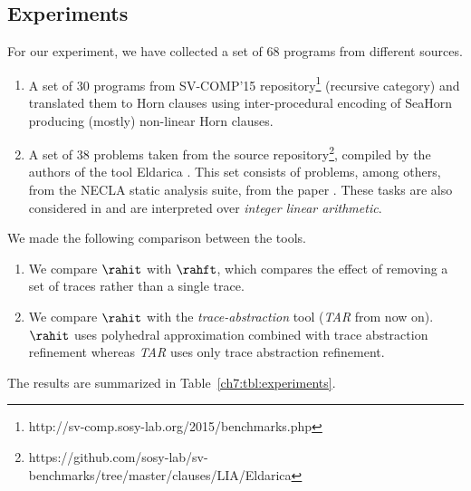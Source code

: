 \subsection{Experiments}
\label{ch7:experiments}

 For our experiment, we have collected a set of 68 programs from different sources.
\begin{enumerate}
\item A set of 30 programs from SV-COMP'15 repository\footnote{http://sv-comp.sosy-lab.org/2015/benchmarks.php} \cite{DBLP:conf/tacas/000115} (recursive category)  and translated them to Horn clauses using inter-procedural encoding of SeaHorn \cite{DBLP:conf/tacas/GurfinkelKN15,DBLP:conf/cav/GurfinkelKKN15} producing  (mostly) non-linear Horn clauses. 

\item A set of 38 problems taken from the source repository\footnote{https://github.com/sosy-lab/sv-benchmarks/tree/master/clauses/LIA/Eldarica}, compiled by the authors of the tool Eldarica \cite{DBLP:conf/fm/HojjatKGIKR12}. This set consists of problems, among others, from  the NECLA static analysis suite, from the paper \cite{DBLP:conf/tacas/JhalaM06}. These tasks  are also considered in \cite{WangJ2015} and  are interpreted over  \emph{integer linear arithmetic}.
\end{enumerate}

We made the following comparison between the tools.

\begin{enumerate}
\item We compare $\rahit$  with  $\rahft$, which compares the effect of removing a set of traces rather than a single trace.  

\item We compare $\rahit$ with the \emph{trace-abstraction} tool \cite{WangJ2015} (\emph{TAR} from now on).   $\rahit$  uses polyhedral approximation combined with trace abstraction refinement  whereas  \emph{TAR} uses only trace abstraction refinement.
\end{enumerate}





The results are summarized in Table~\ref{ch7:tbl:experiments}. 

